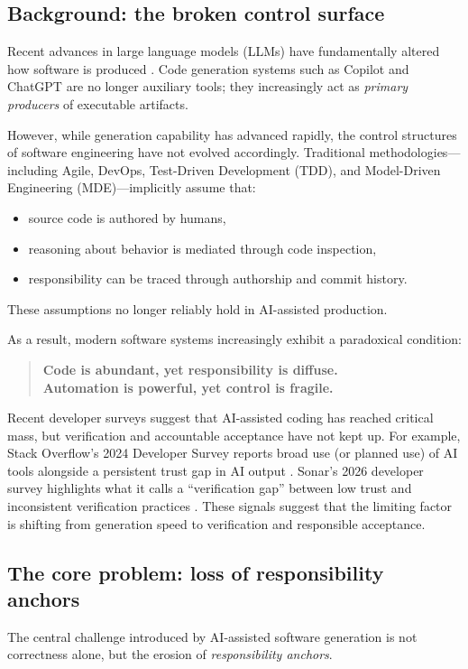 \documentclass[conference]{IEEEtran}
\begin{document}
\subsection{Background: the broken control surface}
Recent advances in large language models (LLMs) have fundamentally altered how software is produced \cite{bubeck2023sparks, chen2021codex}. Code generation systems such as Copilot and ChatGPT are no longer auxiliary tools; they increasingly act as \emph{primary producers} of executable artifacts.

However, while generation capability has advanced rapidly, the control structures of software engineering have not evolved accordingly. Traditional methodologies---including Agile, DevOps, Test-Driven Development (TDD), and Model-Driven Engineering (MDE)---implicitly assume that:
\begin{itemize}
\item source code is authored by humans,
\item reasoning about behavior is mediated through code inspection,
\item responsibility can be traced through authorship and commit history.
\end{itemize}

These assumptions no longer reliably hold in AI-assisted production.

As a result, modern software systems increasingly exhibit a paradoxical condition:
\begin{quote}
\textbf{Code is abundant, yet responsibility is diffuse.\\
Automation is powerful, yet control is fragile.}
\end{quote}

Recent developer surveys suggest that AI-assisted coding has reached critical mass, but verification and accountable acceptance have not kept up. For example, Stack Overflow's 2024 Developer Survey reports broad use (or planned use) of AI tools alongside a persistent trust gap in AI output \cite{stackoverflow2024survey}. Sonar's 2026 developer survey highlights what it calls a ``verification gap'' between low trust and inconsistent verification practices \cite{sonar2026verificationgap}. These signals suggest that the limiting factor is shifting from generation speed to verification and responsible acceptance.

\subsection{The core problem: loss of responsibility anchors}
The central challenge introduced by AI-assisted software generation is not correctness alone, but the erosion of \emph{responsibility anchors}.
\end{document}
